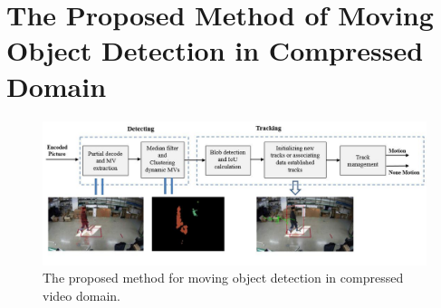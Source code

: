 \section{The Proposed Method of Moving Object Detection in Compressed Domain}
\begin{figure}
\centering
 \includegraphics[width=1.0\linewidth]{Figures/arch.jpg}
 \caption{The proposed method for moving object detection in compressed video domain.}
 \label{fig:proposedMethod}
\end{figure}
